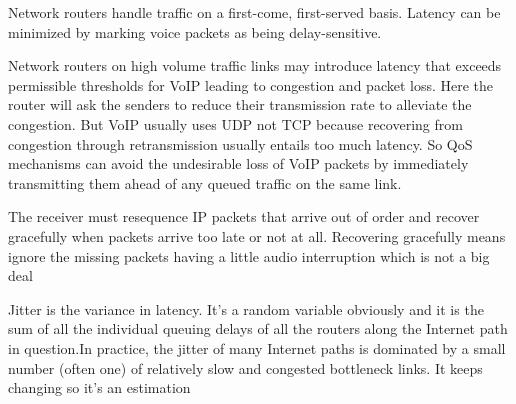 \documentclass[a4paper,12pt]{book}
\begin{document}
Network routers handle traffic on a first-come, first-served basis. Latency can be minimized by marking voice packets as being delay-sensitive.

Network routers on high volume traffic links may introduce latency that exceeds permissible thresholds for VoIP leading to congestion and packet loss. Here the router will ask the senders to reduce their transmission rate to alleviate the congestion. But VoIP usually uses UDP not TCP because recovering from congestion through retransmission usually entails too much latency. So QoS mechanisms can avoid the undesirable loss of VoIP packets by immediately transmitting them ahead of any queued traffic on the same link.


The receiver must resequence IP packets that arrive out of order and recover gracefully when packets arrive too late or not at all. Recovering gracefully means ignore the missing packets having a little audio interruption which is not a big deal


Jitter is the variance in latency. It's a random variable obviously and it is the sum of all the individual queuing delays of all the routers along the Internet path in question.In practice, the jitter of many Internet paths is dominated by a small number (often one) of relatively slow and congested bottleneck links. It keeps changing so it's an estimation
\end{document}
